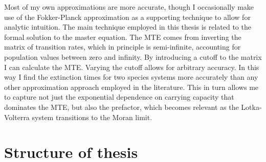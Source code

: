 %
Most of my own approximations are more accurate, though I occasionally make use of the Fokker-Planck approximation as a supporting technique to allow for analytic intuition. 
The main technique employed in this thesis is related to the formal solution to the master equation. 
The MTE comes from inverting the matrix of transition rates, which in principle is semi-infinite, accounting for population values between zero and infinity. 
By introducing a cutoff to the matrix I can calculate the MTE. 
Varying the cutoff allows for arbitrary accuracy. 
In this way I find the extinction times for two species systems more accurately than any other approximation approach employed in the literature. 
This in turn allows me to capture not just the exponential dependence on carrying capacity that dominates the MTE, but also the prefactor, which becomes relevant as the Lotka-Volterra system transitions to the Moran limit. 

\fi



\section{Structure of thesis}

